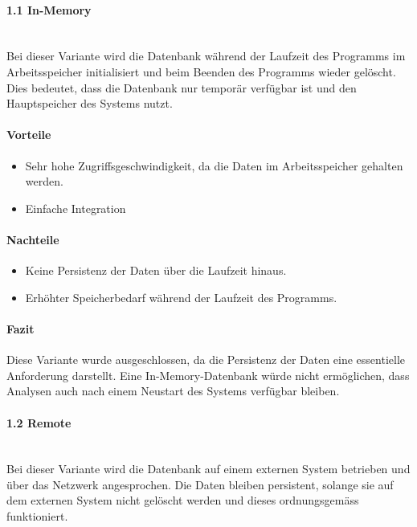 \documentclass[a4paper,12pt]{report}
\begin{document}
    \paragraph*{1.1 In-Memory}\mbox{}\\
    Bei dieser Variante wird die Datenbank während der Laufzeit des Programms im Arbeitsspeicher initialisiert und beim Beenden des Programms wieder gelöscht.
    Dies bedeutet, dass die Datenbank nur temporär verfügbar ist und den Hauptspeicher des Systems nutzt.

    \paragraph*{Vorteile}
    \begin{itemize}
        \item Sehr hohe Zugriffsgeschwindigkeit, da die Daten im Arbeitsspeicher gehalten werden.
        \item Einfache Integration
    \end{itemize}

    \paragraph*{Nachteile}
    \begin{itemize}
        \item Keine Persistenz der Daten über die Laufzeit hinaus.
        \item Erhöhter Speicherbedarf während der Laufzeit des Programms.
    \end{itemize}

    \paragraph*{Fazit}
    Diese Variante wurde ausgeschlossen, da die Persistenz der Daten eine essentielle Anforderung darstellt.
    Eine In-Memory-Datenbank würde nicht ermöglichen, dass Analysen auch nach einem Neustart des Systems verfügbar bleiben.

    \paragraph*{1.2 Remote}\mbox{}\\
    Bei dieser Variante wird die Datenbank auf einem externen System betrieben und über das Netzwerk angesprochen.
    Die Daten bleiben persistent, solange sie auf dem externen System nicht gelöscht werden und dieses ordnungsgemäss funktioniert.
\end{document}
